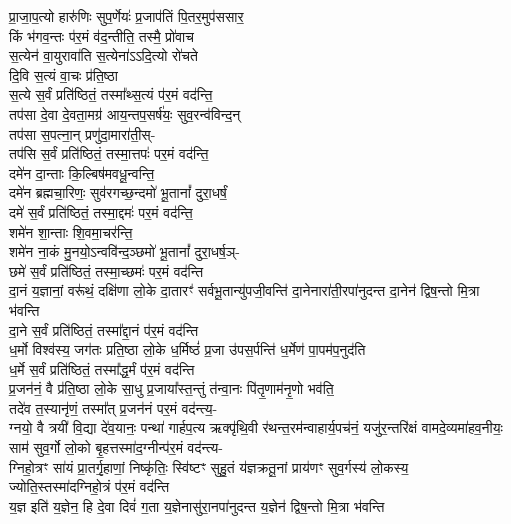 प्रा॒जा॒प॒त्यो हारु॑णिः सुप॒र्णेयः॑ प्र॒जाप॑तिं पि॒तर॒मुप॑ससार॒\\
किं भ॑गव॒न्तः प॑र॒मं व॑द॒न्तीति॒ तस्मै॒ प्रो॑वाच\\
स॒त्येन॑ वा॒युरावा॑ति स॒त्येना॑ऽऽदि॒त्यो रो॑चते \\
दि॒वि स॒त्यं वा॒चः प्र॑ति॒ष्ठा\\ 
स॒त्ये स॒र्वं प्रति॑ष्ठितं॒ तस्मा᳚थ्स॒त्यं प॑र॒मं वद॑न्ति॒\\
तप॑सा दे॒वा दे॒वता॒मग्र॑ आय॒न्तप॒सर्\mbox{}ष॑यः॒ सुव॒रन्व॑विन्द॒न्\\
तप॑सा स॒पत्ना॒न् प्रणु॑दा॒मारा॑ती॒स्-\\
तप॑सि स॒र्वं प्रति॑ष्ठितं॒ तस्मा॒त्तपः॑ पर॒मं वद॑न्ति॒\\
दमे॑न दा॒न्ताः कि॒ल्बिष॑मवधू॒न्वन्ति॒\\
दमे॑न ब्रह्मचा॒रिणः॒ सुव॑रगच्छ॒न्दमो॑ भू॒तानां᳚ दुरा॒धर्\mbox{}षं॒\\
दमे॑ स॒र्वं प्रति॑ष्ठितं॒ तस्मा॒द्दमः॑ पर॒मं वद॑न्ति॒\\
शमे॑न शा॒न्ताः  शि॒वमा॒चर॑न्ति॒\\
शमे॑न ना॒कं मु॒नयो॒ऽन्ववि॑न्द॒ञ्छमो॑ भू॒तानां᳚ दुरा॒धर्\mbox{}ष॒ञ्-\\
छमे॑ स॒र्वं प्रति॑ष्ठितं॒ तस्मा॒च्छमः॑ पर॒मं वद॑न्ति\\
दा॒नं य॒ज्ञानां॒ वरू॑थं॒ दक्षि॑णा लो॒के दा॒तारꣳ॑ सर्वभू॒तान्यु॑पजी॒वन्ति॑ दा॒नेनारा॑ती॒रपा॑नुदन्त दा॒नेन॑ द्विष॒न्तो मि॒त्रा भ॑वन्ति\\
दा॒ने स॒र्वं प्रति॑ष्ठितं॒ तस्मा᳚द्दा॒नं प॑र॒मं वद॑न्ति\\
ध॒र्मो विश्व॑स्य॒ जग॑तः प्रति॒ष्ठा लो॒के ध॒र्मिष्ठं॑ प्र॒जा उ॑पस॒र्पन्ति॑ ध॒र्मेण॑ पा॒पम॑प॒नुद॑ति\\
ध॒र्मे स॒र्वं प्रति॑ष्ठितं॒ तस्मा᳚द्ध॒र्मं प॑र॒मं वद॑न्ति\\
प्र॒जन॑नं॒ वै प्र॑ति॒ष्ठा लो॒के सा॒धु प्र॒जाया᳚स्त॒न्तुं त॑न्वा॒नः पि॑तृ॒णाम॑नृ॒णो भव॑ति॒\\
तदे॑व त॒स्यानृ॑णं॒ तस्मा᳚त् प्र॒जन॑नं पर॒मं वद॑न्त्य॒-\\
ग्नयो॒ वै त्रयी॑ वि॒द्या दे॑व॒यानः॒ पन्था॑ गार्\mbox{}हप॒त्य ऋक्पृ॑थि॒वी र॑थन्त॒रम॑न्वाहार्य॒पच॑नं॒ यजु॑र॒न्तरि॑क्षं वामदे॒व्यमा॑हव॒नीयः॒ साम॑ सुव॒र्गो लो॒को बृ॒हत्तस्मा॑द॒ग्नीन्प॑र॒मं वद॑न्त्य-\\
ग्निहो॒त्रꣳ सा॑यं प्रा॒तर्गृ॒हाणां॒ निष्कृ॑तिः॒ स्वि॑ष्टꣳ सुहु॒तं य॑ज्ञक्रतू॒नां प्राय॑णꣳ सुव॒र्गस्य॑ लो॒कस्य॒ ज्योति॒स्तस्मा॑दग्निहो॒त्रं प॑र॒मं वद॑न्ति\\
य॒ज्ञ इति॑ य॒ज्ञेन॒ हि दे॒वा दिवं॑ ग॒ता य॒ज्ञेनासु॑रा॒नपा॑नुदन्त य॒ज्ञेन॑ द्विष॒न्तो मि॒त्रा भ॑वन्ति\\
